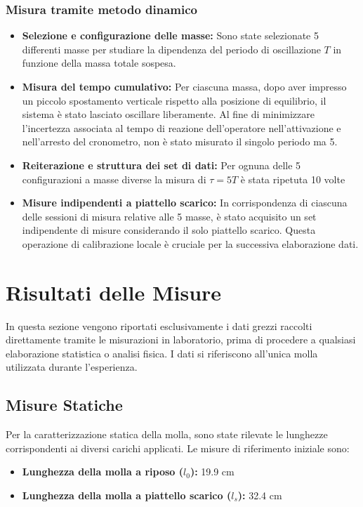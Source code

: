 \documentclass[a4paper,12pt]{article}
\begin{document}
\subsubsection{Misura tramite metodo dinamico}
\begin{itemize}
    \item \textbf{Selezione e configurazione delle masse:} Sono state selezionate 5 differenti masse per studiare la dipendenza del periodo di oscillazione $T$ in funzione della massa totale sospesa.
    
    \item \textbf{Misura del tempo cumulativo:} Per ciascuna massa, dopo aver impresso un piccolo spostamento verticale rispetto alla posizione di equilibrio, il sistema è stato lasciato oscillare liberamente. Al fine di minimizzare l'incertezza associata al tempo di reazione dell'operatore nell'attivazione e nell'arresto del cronometro, non è stato misurato il singolo periodo ma 5.
    
    \item \textbf{Reiterazione e struttura dei set di dati:} Per ognuna delle 5 configurazioni a masse diverse la misura di $\tau = 5T$ è stata ripetuta 10 volte
    
    \item \textbf{Misure indipendenti a piattello scarico:} In corrispondenza di ciascuna delle sessioni di misura relative alle 5 masse, è stato acquisito un set indipendente di misure considerando il solo piattello scarico. Questa operazione di calibrazione locale è cruciale per la successiva elaborazione dati.
\end{itemize}

\section{Risultati delle Misure}

In questa sezione vengono riportati esclusivamente i dati grezzi raccolti direttamente tramite le misurazioni in laboratorio, prima di procedere a qualsiasi elaborazione statistica o analisi fisica. I dati si riferiscono all'unica molla utilizzata durante l'esperienza.

\subsection{Misure Statiche}
Per la caratterizzazione statica della molla, sono state rilevate le lunghezze corrispondenti ai diversi carichi applicati. Le misure di riferimento iniziale sono:
\begin{itemize}
    \item \textbf{Lunghezza della molla a riposo ($l_0$):} 19.9 cm
    \item \textbf{Lunghezza della molla a piattello scarico ($l_s$):} 32.4 cm
\end{itemize}
\end{document}
